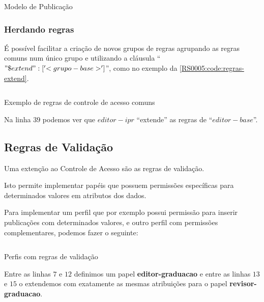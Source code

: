 \begin{code}
    \inputminted[xleftmargin=20pt,fontsize=\footnotesize,breaklines,breakanywhere,linenos=true,label=Post.js]{JavaScript}{../RS0005/anexos/Post.js}
    \caption{Modelo de Publicação}\label{RS0005:code:post}
\end{code}

\subsubsection{Herdando regras}

É possível facilitar a criação de novos grupos de regras agrupando as regras comuns num único grupo e utilizando a cláusula ``$"\$extend": [ '<grupo-base>' ]$'', como no exemplo da \cref{RS0005:code:regras-extend}.

\begin{code}
    \inputminted[xleftmargin=20pt,fontsize=\footnotesize,breaklines,breakanywhere,linenos=true,label=extend.json]{JavaScript}{../RS0005/anexos/rules-extend.js}
    \caption{Exemplo de regras de controle de acesso comuns}\label{RS0005:code:regras-extend}
\end{code}

Na linha $39$ podemos ver que $editor-ipr$ ``extende'' as regras de ``$editor-base$''.

\subsection{Regras de Validação}

Uma extenção ao Controle de Acesso são as regras de validação.

Isto permite implementar papéis que possuem permissões específicas para determinados valores em atributos dos dados.

Para implementar um perfil que por exemplo possui permissão para inserir publicações com determinados valores, e outro perfil com permissões complementares, podemos fazer o seguinte:

\begin{code}
    \inputminted[xleftmargin=20pt,fontsize=\footnotesize,breaklines,breakanywhere,linenos=true,label=Rules.js]{JavaScript}{../RS0005/anexos/rules-validator.js}
    \caption{Perfis com regras de validação}\label{RS0005:code:rules-validator}
\end{code}

Entre as linhas $7$ e $12$ definimos um papel \textbf{editor-graduacao} e entre as linhas $13$ e $15$ o extendemos com exatamente as mesmas atribuições para o papel \textbf{revisor-graduacao}.

